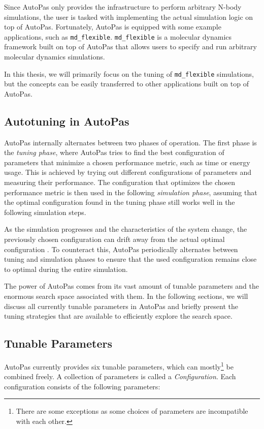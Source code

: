 Since AutoPas only provides the infrastructure to perform arbitrary N-body simulations, the user is tasked with implementing the actual simulation logic on top of AutoPas. Fortunately, AutoPas is equipped with some example applications, such as \texttt{md\_flexible}. \texttt{md\_flexible} is a molecular dynamics framework built on top of AutoPas that allows users to specify and run arbitrary molecular dynamics simulations.

In this thesis, we will primarily focus on the tuning of \texttt{md\_flexible} simulations, but the concepts can be easily transferred to other applications built on top of AutoPas.

\subsection{Autotuning in AutoPas}

AutoPas internally alternates between two phases of operation. The first phase is the \emph{tuning phase}, where AutoPas tries to find the best configuration of parameters that minimize a chosen performance metric, such as time or energy usage. This is achieved by trying out different configurations of parameters and measuring their performance. The configuration that optimizes the chosen performance metric is then used in the following \emph{simulation phase}, assuming that the optimal configuration found in the tuning phase still works well in the following simulation steps.

As the simulation progresses and the characteristics of the system change, the previously chosen configuration can drift away from the actual optimal configuration \cite{GRATL2022108262}. To counteract this, AutoPas periodically alternates between tuning and simulation phases to ensure that the used configuration remains close to optimal during the entire simulation.

The power of AutoPas comes from its vast amount of tunable parameters and the enormous search space associated with them. In the following sections, we will discuss all currently tunable parameters in AutoPas and briefly present the tuning strategies that are available to efficiently explore the search space.

\subsection{Tunable Parameters}

AutoPas currently provides six tunable parameters, which can mostly\footnote{There are some exceptions as some choices of parameters are incompatible with each other.} be combined freely. A collection of parameters is called a \emph{Configuration}. Each configuration consists of the following parameters:

